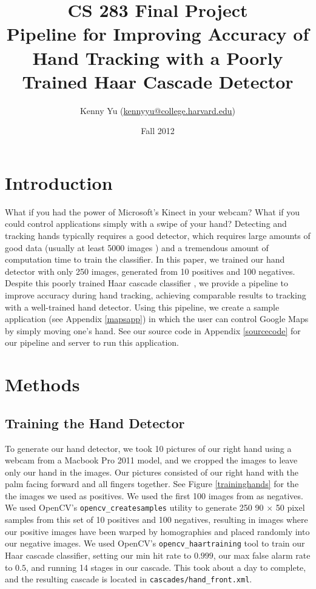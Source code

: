\documentclass[12pt]{article}
\begin{document}
\title{CS 283 Final Project \\ Pipeline for Improving Accuracy of Hand Tracking with a Poorly Trained Haar Cascade Detector}
\date{Fall 2012}
\author{Kenny Yu (\href{mailto:kennyyu@college.harvard.edu}{kennyyu@college.harvard.edu})}
\maketitle

\section{Introduction}
What if you had the power of Microsoft's Kinect \cite{kinect} in your webcam? What if you could control applications simply with a swipe of your hand? Detecting and tracking hands typically requires a good detector, which requires large amounts of good data (usually at least 5000 images \cite{cascadetutorial}) and a tremendous amount of computation time to train the classifier. In this paper, we trained our hand detector with only 250 images, generated from 10 positives and 100 negatives. Despite this poorly trained Haar cascade classifier \cite{violajones}, we provide a pipeline to improve accuracy during hand tracking, achieving comparable results to tracking with a well-trained hand detector. Using this pipeline, we create a sample application (see Appendix \ref{mapsapp}) in which the user can control Google Maps \cite{googlemaps} by simply moving one's hand. See our source code in Appendix \ref{sourcecode} for our pipeline and server to run this application.

\section{Methods}

\subsection{Training the Hand Detector}
To generate our hand detector, we took 10 pictures of our right hand using a webcam from a  Macbook Pro 2011 model, and we cropped the images to leave only our hand in the images. Our pictures consisted of our right hand with the palm facing forward and all fingers together. See Figure \ref{traininghands} for the the images we used as positives. We used the first 100 images from \cite{negatives} as negatives. We used OpenCV's \texttt{opencv\_createsamples} \cite{cascadetutorial} utility to generate 250 90 $\times$ 50 pixel samples from this set of 10 positives and 100 negatives, resulting in images where our positive images have been warped by homographies and placed randomly into our negative images. We used OpenCV's \texttt{opencv\_haartraining} tool to train our Haar cascade classifier, setting our min hit rate to $0.999$, our max false alarm rate to $0.5$, and running 14 stages in our cascade. This took about a day to complete, and the resulting cascade is located in \texttt{cascades/hand\_front.xml}.
\end{document}
